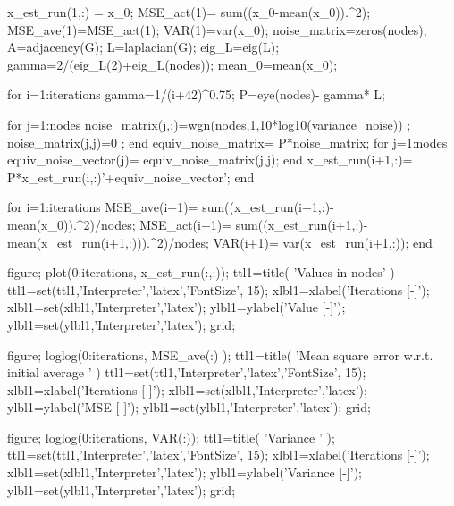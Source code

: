 x_est_run(1,:) = x_0;
MSE_act(1)= sum((x_0-mean(x_0)).^2);
MSE_ave(1)=MSE_act(1);
VAR(1)=var(x_0);
noise_matrix=zeros(nodes);
A=adjacency(G); %
L=laplacian(G); %
eig_L=eig(L);%
gamma=2/(eig_L(2)+eig_L(nodes));%
mean_0=mean(x_0);%

for i=1:iterations
   gamma=1/(i+42)^0.75; %
   P=eye(nodes)- gamma* L; %

   for j=1:nodes %
      noise_matrix(j,:)=wgn(nodes,1,10*log10(variance_noise)) ;
      noise_matrix(j,j)=0 ;
   end
    equiv_noise_matrix= P*noise_matrix;
   for j=1:nodes
     equiv_noise_vector(j)= equiv_noise_matrix(j,j);
   end
   x_est_run(i+1,:)=  P*x_est_run(i,:)'+equiv_noise_vector';  
end

for i=1:iterations
  MSE_ave(i+1)= sum((x_est_run(i+1,:)-mean(x_0)).^2)/nodes;
  MSE_act(i+1)= sum((x_est_run(i+1,:)-mean(x_est_run(i+1,:))).^2)/nodes;   
  VAR(i+1)= var(x_est_run(i+1,:));
end

figure;
plot(0:iterations, x_est_run(:,:));
ttl1=title( 'Values in nodes'  )
ttl1=set(ttl1,'Interpreter','latex','FontSize', 15);
xlbl1=xlabel('Iterations [-]');
xlbl1=set(xlbl1,'Interpreter','latex');
ylbl1=ylabel('Value [-]');
ylbl1=set(ylbl1,'Interpreter','latex');
grid;

figure;
loglog(0:iterations, MSE_ave(:)   );
ttl1=title( 'Mean square error w.r.t. initial average '  )
ttl1=set(ttl1,'Interpreter','latex','FontSize', 15);
xlbl1=xlabel('Iterations [-]');
xlbl1=set(xlbl1,'Interpreter','latex');
ylbl1=ylabel('MSE [-]');
ylbl1=set(ylbl1,'Interpreter','latex');
grid;

figure;
loglog(0:iterations, VAR(:));
ttl1=title( 'Variance '  );
ttl1=set(ttl1,'Interpreter','latex','FontSize', 15);
xlbl1=xlabel('Iterations [-]');
xlbl1=set(xlbl1,'Interpreter','latex');
ylbl1=ylabel('Variance [-]');
ylbl1=set(ylbl1,'Interpreter','latex');
grid;

\endtt

\bye
